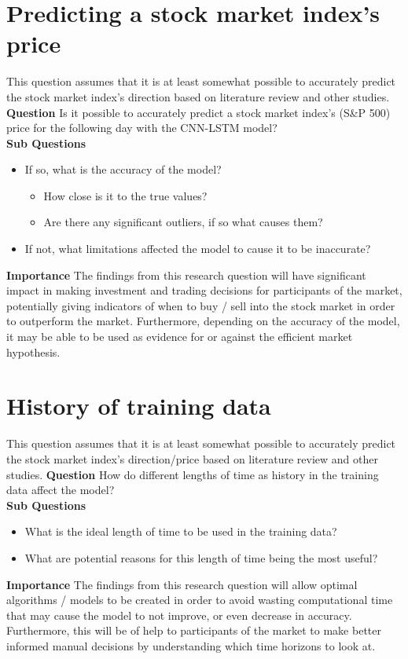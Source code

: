 \section{Predicting a stock market index's price}
This question assumes that it is at least somewhat possible to accurately predict the stock market index's
direction based on literature review and other studies.
\textbf{Question} Is it possible to accurately predict a stock market index's (S\&P 500) price for
the following day with the CNN-LSTM model?\\
\textbf{Sub Questions}
\begin{itemize}
    \item If so, what is the accuracy of the model?
    \begin{itemize}
        \item How close is it to the true values?
        \item Are there any significant outliers, if so what causes them?
    \end{itemize}
    \item If not, what limitations affected the model to cause it to be inaccurate?
\end{itemize}
\textbf{Importance} The findings from this research question will have significant impact in making
investment and trading decisions for participants of the market, potentially giving indicators of
when to buy / sell into the stock market in order to outperform the market. Furthermore, depending
on the accuracy of the model, it may be able to be used as evidence for or against the efficient
market hypothesis.

\section{History of training data}
This question assumes that it is at least somewhat possible to accurately predict the stock market index's
direction/price based on literature review and other studies.
\textbf{Question} How do different lengths of time as history in the training data affect the model?\\
\textbf{Sub Questions}
\begin{itemize}
    \item What is the ideal length of time to be used in the training data?
    \item What are potential reasons for this length of time being the most useful?
\end{itemize}
\textbf{Importance} The findings from this research question will allow optimal algorithms /
models to be created in order to avoid wasting computational time that may cause the model to 
not improve, or even decrease in accuracy. Furthermore, this will be of help to participants of
the market to make better informed manual decisions by understanding which time horizons to look
at.

